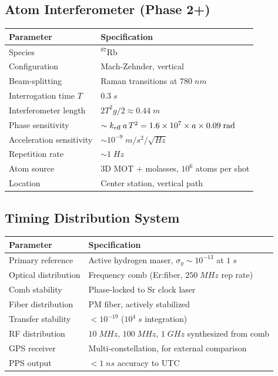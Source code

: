 \documentclass[11pt,a4paper]{article}
\begin{document}
\subsection{Atom Interferometer (Phase 2+)}

\begin{longtable}{p{}p{}}
\toprule
\textbf{Parameter} & \textbf{Specification} \\
\midrule
\endhead
Species & $^{87}$Rb \\
Configuration & Mach-Zehnder, vertical \\
Beam-splitting & Raman transitions at $780\;\si{nm}$ \\
Interrogation time $T$ & $0.3\;\si{s}$ \\
Interferometer length & $2T^2 g/2 \approx 0.44\;\si{m}$ \\
Phase sensitivity & $\sim k_{\rm eff}\,a\,T^2
= 1.6 \times 10^7 \times a \times 0.09\;\si{rad}$ \\
Acceleration sensitivity & $\sim 10^{-9}\;\si{m/s^2/\sqrt{Hz}}$ \\
Repetition rate & $\sim 1\;\si{Hz}$ \\
Atom source & 3D MOT + molasses, $10^6$ atoms per shot \\
Location & Center station, vertical path \\
\bottomrule
\end{longtable}

\subsection{Timing Distribution System}

\begin{longtable}{p{}p{}}
\toprule
\textbf{Parameter} & \textbf{Specification} \\
\midrule
\endhead
Primary reference & Active hydrogen maser,
$\sigma_y \sim 10^{-13}$ at $1\;\si{s}$ \\
Optical distribution & Frequency comb (Er:fiber, $250\;\si{MHz}$
rep rate) \\
Comb stability & Phase-locked to Sr clock laser \\
Fiber distribution & PM fiber, actively stabilized \\
Transfer stability & $< 10^{-19}$ ($10^4\;\si{s}$ integration) \\
RF distribution & $10\;\si{MHz}$, $100\;\si{MHz}$, $1\;\si{GHz}$
synthesized from comb \\
GPS receiver & Multi-constellation, for external comparison \\
PPS output & $< 1\;\si{ns}$ accuracy to UTC \\
\bottomrule
\end{longtable}
\end{document}
